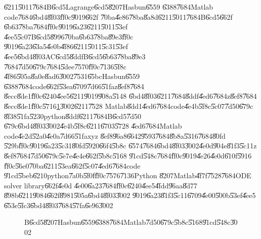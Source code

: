 \begin{case}
\U{6211}\U{5011}\U{7684}B\U{6cd5}Lagrange\U{6cd5}\U{8207}Hasbun\U{6559}%
\U{6388}\U{7684}Matlab code\U{7684}\U{6bd4}\U{8f03}\U{ff0c}\U{9019}\U{662f}%
\U{70ba}\U{4e86}\U{78ba}\U{8a8d}\U{6211}\U{5011}\U{7684}B\U{6cd5}\U{662f}%
\U{6b63}\U{78ba}\U{7684}\U{ff0c}\U{9019}\U{6a23}\U{6211}\U{5011}\U{53ef}%
\U{4ee5}\U{5c07}B\U{6cd5}\U{8996}\U{70ba}\U{6b63}\U{78ba}\U{89e3}\U{ff0c}%
\U{9019}\U{6a23}\U{63a5}\U{4e0b}\U{4f86}\U{6211}\U{5011}\U{5c31}\U{53ef}%
\U{4ee5}\U{6bd4}\U{8f03}AC\U{6cd5}\U{8ddf}B\U{6cd5}\U{6b63}\U{78ba}\U{89e3}%
\U{7684}\U{7d50}\U{679c}\U{7684}\U{5dee}\U{7570}\U{ff0c}\U{7136}\U{5f8c}%
\U{4f86}\U{505a}\U{8a0e}\U{8ad6}\U{3002}\U{7531}\U{65bc}Hasbun\U{6559}%
\U{6388}\U{7684}code\U{662f}\U{53ea}\U{6709}\U{7d66}\U{51fa}z\U{8ef8}\U{7684}%
\U{8ecc}\U{8de1}\U{ff0c}\U{6240}\U{4ee5}\U{6211}\U{9019}\U{908a}\U{5148}%
\U{6bd4}\U{8f03}\U{6211}\U{7684}\U{8ddf}\U{4ed6}\U{7684}z\U{8ef8}\U{7684}%
\U{8ecc}\U{8de1}\U{ff0c}\U{5716}\ref{BandHasbun}\U{3002}\U{6211}\U{7528}%
Matlab\U{8dd1}\U{4ed6}\U{7684}code\U{4e4b}\U{5f8c}\U{5c07}\U{7d50}\U{679c}%
\U{8f38}\U{51fa}\U{5230}python\U{8ddf}\U{6211}\U{7684}B\U{6cd5}\U{7d50}%
\U{679c}\U{6bd4}\U{8f03}\U{3002}\U{4e4b}\U{5f8c}\U{6211}\U{6703}\U{5728}%
\U{4ed6}\U{7684}Matlab code\U{4e2d}\U{52a0}\U{4e0a}\U{7d66}\U{51fa}xyz%
\U{8ef8}\U{96a8}\U{6642}\U{9593}\U{7684}\U{8b8a}\U{5316}\U{7684}\U{80fd}%
\U{529b}\U{ff0c}\U{9019}\U{6a23}\U{5c31}\U{80fd}\U{5920}\U{66f4}\U{5b8c}%
\U{6574}\U{7684}\U{6bd4}\U{8f03}\U{3002}\U{4e0d}\U{904e}\U{81f3}\U{5c11}z%
\U{8ef8}\U{7684}\U{7d50}\U{679c}\U{5e7e}\U{4e4e}\U{662f}\U{5b8c}\U{5168}%
\U{91cd}\U{548c}\U{7684}\U{ff0c}\U{9019}\U{4e26}\U{4e0d}\U{610f}\U{5916}%
\U{ff0c}\U{56e0}\U{70ba}\U{6211}\U{53ea}\U{662f}\U{5c07}\U{4ed6}\U{7684}code%
\U{91cd}\U{5beb}\U{6210}python\U{7a0b}\U{5f0f}\U{ff0c}\U{7576}\U{7136}Python%
\U{8207}Matlab\U{4f7f}\U{7528}\U{7684}ODE solver library\U{662f}\U{4e0d}%
\U{4e00}\U{6a23}\U{7684}\U{ff0c}\U{6240}\U{4ee5}\U{4fdd}\U{96aa}\U{8d77}%
\U{898b}\U{6211}\U{9084}\U{662f}\U{8981}\U{505a}\U{6bd4}\U{8f03}\U{3002}%
\U{9019}\U{6a23}\U{81f3}\U{5c11}\U{6709}\U{4e00}\U{500b}\U{53ef}\U{4ee5}%
\U{653e}\U{5fc3}\U{6bd4}\U{8f03}\U{7684}\U{57fa}\U{6e96}\U{3002}%
\begin{figure}
[th]
\caption{B\U{6cd5}\U{8207}Hasbun\U{6559}\U{6388}\U{7684}Matlab\U{7d50}\U{679c}\U{5b8c}\U{5168}\U{91cd}\U{548c}\U{3002}}
\label{BandHasbun}
\begin{center}
\end{center}
\end{figure}%
\end{case}

